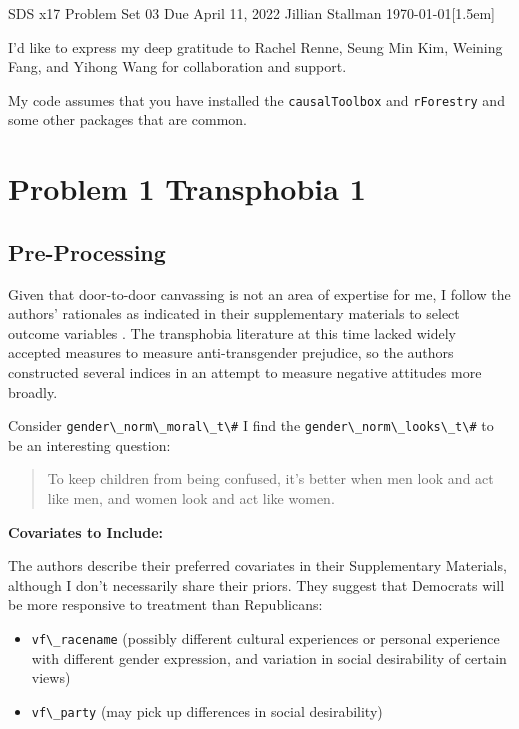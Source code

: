 \noindent
\Large SDS x17  
 	\large Problem Set 03  
 	\large Due April 11, 2022 
 	\large Jillian Stallman 
 	\today  [1.5em] %
 	

I'd like to express my deep gratitude to Rachel Renne, Seung Min Kim, Weining Fang, and Yihong Wang for collaboration and support. 

My code assumes that you have installed the \verb+causalToolbox+ and \verb+rForestry+ and some other packages that are common.

\section{Problem 1 Transphobia 1}


\subsection{Pre-Processing}

    Given that door-to-door canvassing is not an area of expertise for me, I follow the authors' rationales as indicated in their supplementary materials to select outcome variables \citep[p.6-10]{broockmanSupplementaryMaterialsDurably2016}. The transphobia literature at this time lacked widely accepted measures to measure anti-transgender prejudice, so the authors constructed several indices in an attempt to measure negative attitudes more broadly. 
    
   
    
    Consider \verb+gender\_norm\_moral\_t\#+  I find the \verb+gender\_norm\_looks\_t\#+ to be an interesting question: 
    \begin{quote}
    To keep children from being confused, it's better when men look and act like men, and women look and act like women.    
    \end{quote} 
    
    
    \textbf{Covariates to Include:}
    
    The authors describe their preferred covariates in their Supplementary Materials, although I don't necessarily share their priors. They suggest that Democrats will be more responsive to treatment than Republicans:
    \begin{itemize}
        \item \verb+vf\_racename+ (possibly different cultural experiences or personal experience with different gender expression, and variation in social desirability of certain views)
        \item \verb+vf\_party+ (may pick up differences in social desirability)
    \end{itemize}
    
